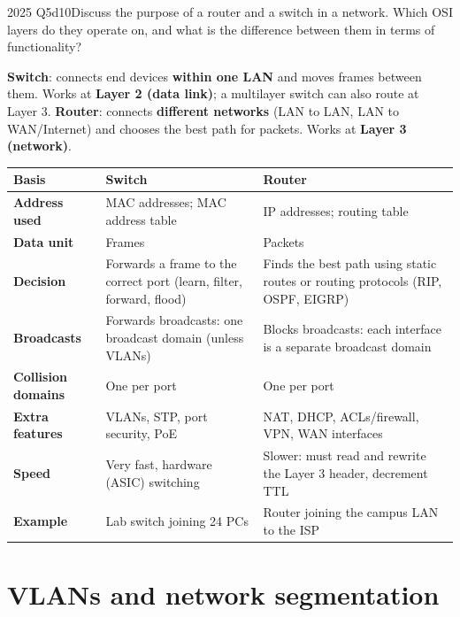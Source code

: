 \documentclass[10pt]{article}
\begin{document}
\begin{pastq}{2025 Q5d}{10}Discuss the purpose of a router and a switch in a network. Which OSI layers do they operate on, and what is the difference between them in terms of functionality?\end{pastq}
\begin{ans}
\textbf{Switch}: connects end devices \textbf{within one LAN} and moves frames between them. Works at \textbf{Layer 2 (data link)}; a multilayer switch can also route at Layer 3.
\textbf{Router}: connects \textbf{different networks} (LAN to LAN, LAN to WAN/Internet) and chooses the best path for packets. Works at \textbf{Layer 3 (network)}.

\small
\begin{tabularx}{\linewidth}{@{}>{\bfseries}p{2.3cm}XX@{}}
\toprule
Basis & Switch & Router\\\midrule
Address used & MAC addresses; MAC address table & IP addresses; routing table\\
Data unit & Frames & Packets\\
Decision & Forwards a frame to the correct port (learn, filter, forward, flood) & Finds the best path using static routes or routing protocols (RIP, OSPF, EIGRP)\\
Broadcasts & Forwards broadcasts: one broadcast domain (unless VLANs) & Blocks broadcasts: each interface is a separate broadcast domain\\
Collision domains & One per port & One per port\\
Extra features & VLANs, STP, port security, PoE & NAT, DHCP, ACLs/firewall, VPN, WAN interfaces\\
Speed & Very fast, hardware (ASIC) switching & Slower: must read and rewrite the Layer 3 header, decrement TTL\\
Example & Lab switch joining 24 PCs & Router joining the campus LAN to the ISP\\
\bottomrule
\end{tabularx}
\end{ans}

\section{VLANs and network segmentation}
\end{document}
